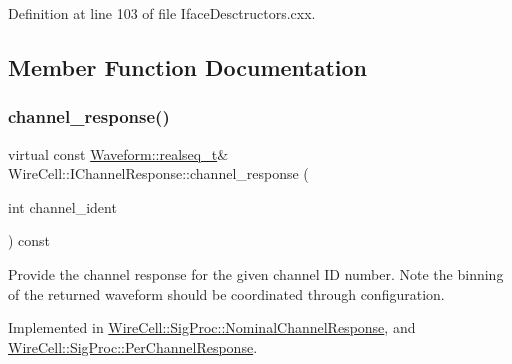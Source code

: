 Definition at line 103 of file Iface\+Desctructors.\+cxx.



\subsection{Member Function Documentation}
\mbox{\label{class_wire_cell_1_1_i_channel_response_aee79a65bc671678d529eca0e4792e10d}} 
\subsubsection{\texorpdfstring{channel\+\_\+response()}{channel\_response()}}
{\footnotesize\ttfamily virtual const \hyperlink{namespace_wire_cell_1_1_waveform_a479175e541c8545e87cd8063b74b6956}{Waveform\+::realseq\+\_\+t}\& Wire\+Cell\+::\+I\+Channel\+Response\+::channel\+\_\+response (\begin{DoxyParamCaption}\item[{int}]{channel\+\_\+ident }\end{DoxyParamCaption}) const\hspace{0.3cm}{\ttfamily [pure virtual]}}

Provide the channel response for the given channel ID number. Note the binning of the returned waveform should be coordinated through configuration. 

Implemented in \hyperlink{class_wire_cell_1_1_sig_proc_1_1_nominal_channel_response_a494997d5336628959e8585fd8d5a509d}{Wire\+Cell\+::\+Sig\+Proc\+::\+Nominal\+Channel\+Response}, and \hyperlink{class_wire_cell_1_1_sig_proc_1_1_per_channel_response_a9112d33075a8ac432b5e32bed5c65f5b}{Wire\+Cell\+::\+Sig\+Proc\+::\+Per\+Channel\+Response}.

\mbox{\label{class_wire_cell_1_1_i_channel_response_a6a3daf077f98883b5d4f9dd6529e99fe}} 
